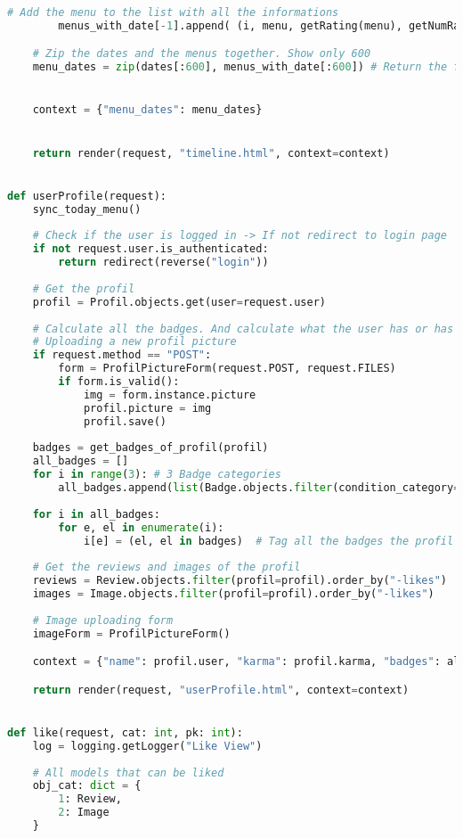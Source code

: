 \begin{lstlisting}[language=Python]
        # Add the menu to the list with all the informations
        menus_with_date[-1].append( (i, menu, getRating(menu), getNumRates(menu)) )

    # Zip the dates and the menus together. Show only 600
    menu_dates = zip(dates[:600], menus_with_date[:600]) # Return the first 600 menus


    context = {"menu_dates": menu_dates}  


    return render(request, "timeline.html", context=context)


def userProfile(request):
    sync_today_menu()
    
    # Check if the user is logged in -> If not redirect to login page
    if not request.user.is_authenticated:
        return redirect(reverse("login"))
    
    # Get the profil
    profil = Profil.objects.get(user=request.user)
    
    # Calculate all the badges. And calculate what the user has or has not achieved.
    # Uploading a new profil picture
    if request.method == "POST":
        form = ProfilPictureForm(request.POST, request.FILES)
        if form.is_valid():
            img = form.instance.picture
            profil.picture = img
            profil.save()
    
    badges = get_badges_of_profil(profil)
    all_badges = []
    for i in range(3): # 3 Badge categories
        all_badges.append(list(Badge.objects.filter(condition_category=i).order_by("count")))
        
    for i in all_badges:
        for e, el in enumerate(i):
            i[e] = (el, el in badges)  # Tag all the badges the profil posses
    
    # Get the reviews and images of the profil
    reviews = Review.objects.filter(profil=profil).order_by("-likes")
    images = Image.objects.filter(profil=profil).order_by("-likes")
    
    # Image uploading form
    imageForm = ProfilPictureForm()

    context = {"name": profil.user, "karma": profil.karma, "badges": all_badges, "images": images, "reviews": reviews, "imageForm": imageForm, "picture": profil.picture}

    return render(request, "userProfile.html", context=context)


def like(request, cat: int, pk: int):
    log = logging.getLogger("Like View")
    
    # All models that can be liked
    obj_cat: dict = {
        1: Review,
        2: Image
    }
    

\end{lstlisting}
